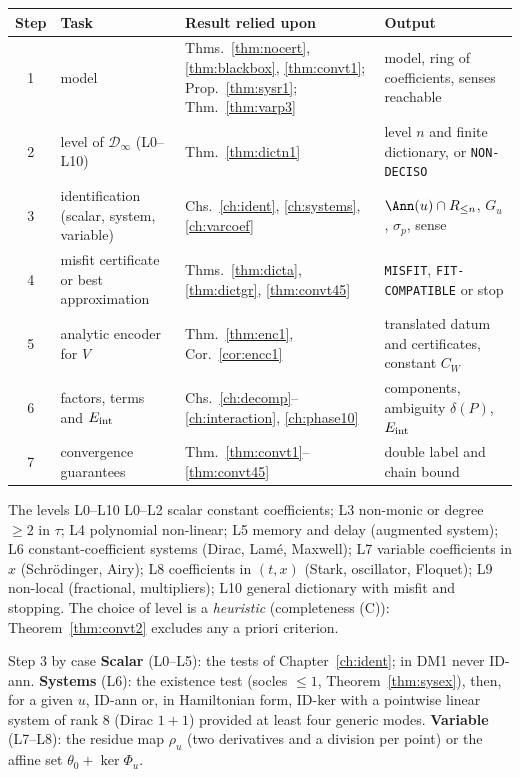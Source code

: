 \begin{center}\small
\begin{tabular}{@{}c L{2.6cm} L{5.4cm} L{5.0cm}@{}}
\toprule
Step & Task & Result relied upon & Output\\ & model & Thms.~\ref{thm:nocert}, \ref{thm:blackbox}, \ref{thm:convt1}; Prop.~\ref{thm:sysr1}; Thm.~\ref{thm:varp3} & model, ring of coefficients, senses reachable\\
2 & level of $\mathcal D_\infty$ (L0--L10) & Thm.~\ref{thm:dictn1} & level $n$ and finite dictionary, or \texttt{NON-DECISO}\\
3 & identification (scalar, system, variable) & Chs.~\ref{ch:ident}, \ref{ch:systems}, \ref{ch:varcoef} & $\Ann(u)\cap R_{\le n}$, $G_u$, $\sigma_p$, sense\\
4 & misfit certificate or best approximation & Thms.~\ref{thm:dicta}, \ref{thm:dictgr}, \ref{thm:convt45} & \texttt{MISFIT}, \texttt{FIT-COMPATIBLE} or stop\\
5 & analytic encoder for $V$ & Thm.~\ref{thm:enc1}, Cor.~\ref{cor:encc1} & translated datum and certificates, constant $C_W$\\
6 & factors, terms and $E_{\rm int}$ & Chs.~\ref{ch:decomp}--\ref{ch:interaction}, \ref{ch:phase10} & components, ambiguity $\delta(P)$, $E_{\rm int}$\\
7 & convergence guarantees & Thm.~\ref{thm:convt1}--\ref{thm:convt45} & double label and chain bound\\\bottomrule
\end{tabular}
\end{center}

\begin{aside}{The levels L0--L10}
L0--L2 scalar constant coefficients; L3 non-monic or degree $\ge2$ in $\tau$; L4 polynomial non-linear; L5 memory and delay (augmented system); L6 constant-coefficient systems (Dirac, Lam\'e, Maxwell); L7 variable coefficients in $x$ (Schr\"odinger, Airy); L8 coefficients in $(t,x)$ (Stark, oscillator, Floquet); L9 non-local (fractional, multipliers); L10 general dictionary with misfit and stopping. The choice of level is a \emph{heuristic} (completeness (C)): Theorem~\ref{thm:convt2} excludes any a priori criterion.
\end{aside}

\begin{aside}{Step 3 by case}
\textbf{Scalar} (L0--L5): the tests of Chapter~\ref{ch:ident}; in DM1 never ID-ann. \textbf{Systems} (L6): the existence test (socles $\le1$, Theorem~\ref{thm:sysex}), then, for a given $u$, ID-ann or, in Hamiltonian form, ID-ker with a pointwise linear system of rank $8$ (Dirac $1+1$) provided at least four generic modes. \textbf{Variable} (L7--L8): the residue map $\rho_u$ (two derivatives and a division per point) or the affine set $\theta_0+\ker\Phi_u$.
\end{aside}

